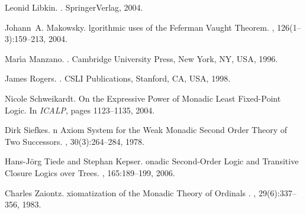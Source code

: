 \documentclass{LMCS}
\begin{document}
\begin{thebibliography}{10}
Leonid Libkin.
.
\newblock SpringerVerlag, 2004.

Johann~A. Makowsky.
lgorithmic uses of the {F}eferman {V}aught {T}heorem.
, 126(1--3):159--213, 2004.

Mar\'{\i}a Manzano.
.
\newblock Cambridge University Press, New York, NY, USA, 1996.

James Rogers.
.
\newblock CSLI Publications, Stanford, CA, USA, 1998.

Nicole Schweikardt.
\newblock On the {E}xpressive {P}ower of {M}onadic {L}east {F}ixed-{P}oint
  {L}ogic.
\newblock In {\em ICALP}, pages 1123--1135, 2004.

Dirk Siefkes.
n {A}xiom {S}ystem for the {W}eak {M}onadic {S}econd {O}rder
  {T}heory of {T}wo {S}uccessors.
, 30(3):264--284, 1978.

Hans-J\"{o}rg Tiede and Stephan Kepser.
onadic {S}econd-{O}rder {L}ogic and {T}ransitive {C}losure
  {L}ogics over {T}rees.
, 165:189--199, 2006.

Charles Zaiontz.
xiomatization of the {M}onadic {T}heory of {O}rdinals .
, 29(6):337--356, 1983.



\end{thebibliography}
\end{document}
